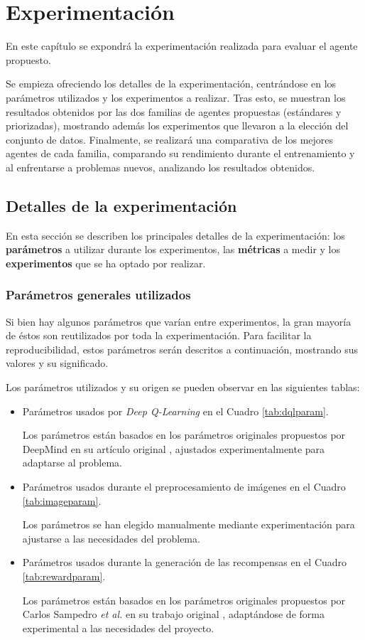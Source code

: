 \chapter{Experimentación}

En este capítulo se expondrá la experimentación realizada para evaluar el agente propuesto.

Se empieza ofreciendo los detalles de la experimentación, centrándose en los parámetros utilizados y los experimentos a realizar. Tras esto, se muestran los resultados obtenidos por las dos familias de agentes propuestas (estándares y priorizadas), mostrando además los experimentos que llevaron a la elección del conjunto de datos. Finalmente, se realizará una comparativa de los mejores agentes de cada familia, comparando su rendimiento durante el entrenamiento y al enfrentarse a problemas nuevos, analizando los resultados obtenidos.

\section{Detalles de la experimentación}

En esta sección se describen los principales detalles de la experimentación: los \textbf{parámetros} a utilizar durante los experimentos, las \textbf{métricas} a medir y los \textbf{experimentos} que se ha optado por realizar.

\subsection{Parámetros generales utilizados}

Si bien hay algunos parámetros que varían entre experimentos, la gran mayoría de éstos son reutilizados por toda la experimentación. Para facilitar la reproducibilidad, estos parámetros serán descritos a continuación, mostrando sus valores y su significado.

Los parámetros utilizados y su origen se pueden observar en las siguientes tablas:
\begin{itemize}
	\item Parámetros usados por \textit{Deep Q-Learning} en el Cuadro \ref{tab:dqlparam}.
	
	Los parámetros están basados en los parámetros originales propuestos por DeepMind en su artículo original \cite{Mnih2015HumanlevelCT}, ajustados experimentalmente para adaptarse al problema.
	
	\item Parámetros usados durante el preprocesamiento de imágenes en el Cuadro \ref{tab:imageparam}.
	
	Los parámetros se han elegido manualmente mediante experimentación para ajustarse a las necesidades del problema.
	
	\item Parámetros usados durante la generación de las recompensas en el Cuadro \ref{tab:rewardparam}.
	
	Los parámetros están basados en los parámetros originales propuestos por Carlos Sampedro \textit{et al.} en su trabajo original \cite{Sampedro2018}, adaptándose de forma experimental a las necesidades del proyecto.
\end{itemize}

